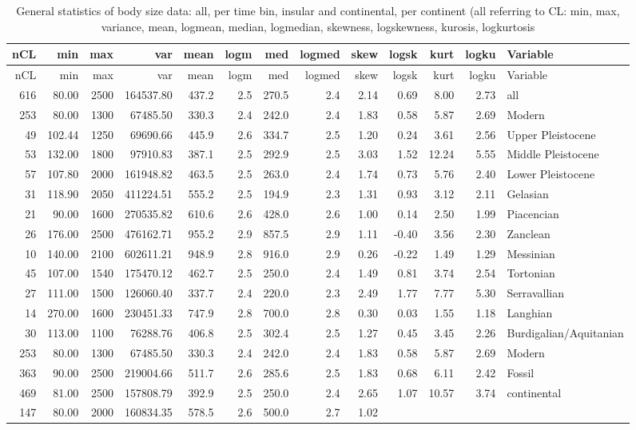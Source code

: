 \begin{landscape}
\begin{longtable}[]{@{}rrrrrrrrrrrrl@{}}
	\caption[General statistics]{General statistics of body size data: all, per time bin,
		insular and continental, per continent (all referring to CL: min, max,
		variance, mean, logmean, median, logmedian, skewness, logskewness,
		kurosis, logkurtosis}\tabularnewline
	\toprule
	nCL & min & max & var & mean & logm & med & logmed & skew & logsk & kurt
	& logku & Variable\tabularnewline
	\midrule
	\endfirsthead
	\toprule
	nCL & min & max & var & mean & logm & med & logmed & skew & logsk & kurt
	& logku & Variable\tabularnewline
	\midrule
	\endhead
	616 & 80.00 & 2500 & 164537.80 & 437.2 & 2.5 & 270.5 & 2.4 & 2.14 & 0.69
	& 8.00 & 2.73 & all\tabularnewline
	253 & 80.00 & 1300 & 67485.50 & 330.3 & 2.4 & 242.0 & 2.4 & 1.83 & 0.58
	& 5.87 & 2.69 & Modern\tabularnewline
	49 & 102.44 & 1250 & 69690.66 & 445.9 & 2.6 & 334.7 & 2.5 & 1.20 & 0.24
	& 3.61 & 2.56 & Upper Pleistocene\tabularnewline
	53 & 132.00 & 1800 & 97910.83 & 387.1 & 2.5 & 292.9 & 2.5 & 3.03 & 1.52
	& 12.24 & 5.55 & Middle Pleistocene\tabularnewline
	57 & 107.80 & 2000 & 161948.82 & 463.5 & 2.5 & 263.0 & 2.4 & 1.74 & 0.73
	& 5.76 & 2.40 & Lower Pleistocene\tabularnewline
	31 & 118.90 & 2050 & 411224.51 & 555.2 & 2.5 & 194.9 & 2.3 & 1.31 & 0.93
	& 3.12 & 2.11 & Gelasian\tabularnewline
	21 & 90.00 & 1600 & 270535.82 & 610.6 & 2.6 & 428.0 & 2.6 & 1.00 & 0.14
	& 2.50 & 1.99 & Piacencian\tabularnewline
	26 & 176.00 & 2500 & 476162.71 & 955.2 & 2.9 & 857.5 & 2.9 & 1.11 &
	-0.40 & 3.56 & 2.30 & Zanclean\tabularnewline
	10 & 140.00 & 2100 & 602611.21 & 948.9 & 2.8 & 916.0 & 2.9 & 0.26 &
	-0.22 & 1.49 & 1.29 & Messinian\tabularnewline
	45 & 107.00 & 1540 & 175470.12 & 462.7 & 2.5 & 250.0 & 2.4 & 1.49 & 0.81
	& 3.74 & 2.54 & Tortonian\tabularnewline
	27 & 111.00 & 1500 & 126060.40 & 337.7 & 2.4 & 220.0 & 2.3 & 2.49 & 1.77
	& 7.77 & 5.30 & Serravallian\tabularnewline
	14 & 270.00 & 1600 & 230451.33 & 747.9 & 2.8 & 700.0 & 2.8 & 0.30 & 0.03
	& 1.55 & 1.18 & Langhian\tabularnewline
	30 & 113.00 & 1100 & 76288.76 & 406.8 & 2.5 & 302.4 & 2.5 & 1.27 & 0.45
	& 3.45 & 2.26 & Burdigalian/Aquitanian\tabularnewline
	253 & 80.00 & 1300 & 67485.50 & 330.3 & 2.4 & 242.0 & 2.4 & 1.83 & 0.58
	& 5.87 & 2.69 & Modern\tabularnewline
	363 & 90.00 & 2500 & 219004.66 & 511.7 & 2.6 & 285.6 & 2.5 & 1.83 & 0.68
	& 6.11 & 2.42 & Fossil\tabularnewline
	469 & 81.00 & 2500 & 157808.79 & 392.9 & 2.5 & 250.0 & 2.4 & 2.65 & 1.07
	& 10.57 & 3.74 & continental\tabularnewline
	147 & 80.00 & 2000 & 160834.35 & 578.5 & 2.6 & 500.0 & 2.7 & 1.02 &

\end{longtable}
\end{landscape}
